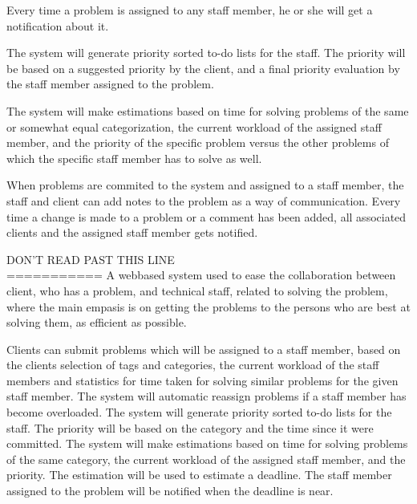 Every time a problem is assigned to any staff member, he or she will get a notification about it.

The system will generate priority sorted to-do lists for the staff. The priority will be based on a suggested priority by the client, and a final priority evaluation by the staff member assigned to the problem.

The system will make estimations based on time for solving problems of the same or somewhat equal categorization, the current workload of the assigned staff member, and the priority of the specific problem versus the other problems of which the specific staff member has to solve as well.

When problems are commited to the system and assigned to a staff member, the staff and client can add notes to the problem as a way of communication. Every time a change is made to a problem or a comment has been added, all associated clients and the assigned staff member gets notified.


DON'T READ PAST THIS LINE\\




===========
A webbased system used to ease the collaboration between client, who has a problem, and technical staff, related to solving the problem, where the main empasis is on getting the problems to the persons who are best at solving them, as efficient as possible.
 
Clients can submit problems which will be assigned to a staff member, based on the clients selection of tags and categories, the current workload of the staff members and statistics for time taken for solving similar problems for the given staff member. 
The system will automatic reassign problems if a staff member has become overloaded.
The system will generate priority sorted to-do lists for the staff. The priority will be based on the category and the time since it were committed.
The system will make estimations based on time for solving problems of the same category, the current workload of the assigned staff member, and the priority. The estimation will be used to estimate a deadline. The staff member assigned to the problem will be notified when the deadline is near.\\

